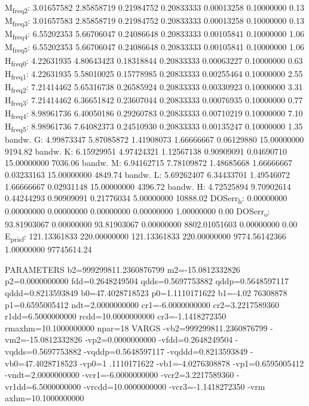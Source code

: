 \documentclass[11pt]{article}
\begin{document}
M\textsubscript{freq}\textsubscript{2}:   3.01657582   2.85858719   0.21984752   0.20833333   0.00013258   0.10000000         0.13
M\textsubscript{freq}\textsubscript{3}:   3.01657583   2.85858719   0.21984752   0.20833333   0.00013258   0.10000000         0.13
M\textsubscript{freq}\textsubscript{4}:   6.55202353   5.66706047   0.24086648   0.20833333   0.00105841   0.10000000         1.06
M\textsubscript{freq}\textsubscript{5}:   6.55202353   5.66706047   0.24086648   0.20833333   0.00105841   0.10000000         1.06
H\textsubscript{freq}\textsubscript{0}:   4.22631935   4.80643423   0.18318844   0.20833333   0.00063227   0.10000000         0.63
H\textsubscript{freq}\textsubscript{1}:   4.22631935   5.58010025   0.15778985   0.20833333   0.00255464   0.10000000         2.55
H\textsubscript{freq}\textsubscript{2}:   7.21414462   5.65316738   0.26585924   0.20833333   0.00330923   0.10000000         3.31
H\textsubscript{freq}\textsubscript{3}:   7.21414462   6.36651842   0.23607044   0.20833333   0.00076935   0.10000000         0.77
H\textsubscript{freq}\textsubscript{4}:   8.98961736   6.40050186   0.29260783   0.20833333   0.00710219   0.10000000         7.10
H\textsubscript{freq}\textsubscript{5}:   8.98961736   7.64082373   0.24510930   0.20833333   0.00135247   0.10000000         1.35
bandw. G:   4.99873347   5.87085872   1.41908073   1.66666667   0.06129880  15.00000000      9194.82
bandw. K:   6.15929951   4.97424321   1.12567138   0.90909091   0.04690710  15.00000000      7036.06
bandw. M:   6.94162715   7.78109872   1.48685668   1.66666667   0.03233163  15.00000000      4849.74
bandw. L:   5.69262407   6.34433701   1.49546072   1.66666667   0.02931148  15.00000000      4396.72
bandw. H:   4.72525894   9.70902614   0.44244293   0.90909091   0.21776034   5.00000000     10888.02
DOSerr\textsubscript{h}:   0.00000000   0.00000000   0.00000000   0.00000000   0.00000000   1.00000000         0.00
DOSerr\textsubscript{o}:  93.81903067   0.00000000  93.81903067   0.00000000 8802.01051603   0.00000000         0.00
E\textsubscript{pris}\textsubscript{f}: 121.13361833 220.00000000 121.13361833 220.00000000 9774.56142366   1.00000000  97745614.24

PARAMETERS
  b2=999299811.2360876799 m2=-15.0812332826 p2=0.0000000000 fdd=0.2648249504 qdds=0.5697753882 qddp=0.5648597117 qddd=0.8213593849 b0=47.4028718523 p0=1.1110171622 b1=-4.02
76308878 p1=0.6595005412 ndt=2.0000000000 cr1=-6.0000000000 cr2=3.2217589360 r1dd=6.5000000000 rcdd=10.0000000000 cr3=-1.1418272350 rmaxhm=10.1000000000 npar=18 
VARGS
    -vb2=999299811.2360876799 -vm2=-15.0812332826 -vp2=0.0000000000 -vfdd=0.2648249504 -vqdds=0.5697753882 -vqddp=0.5648597117 -vqddd=0.8213593849 -vb0=47.4028718523 -vp0=1
.1110171622 -vb1=-4.0276308878 -vp1=0.6595005412 -vndt=2.0000000000 -vcr1=-6.0000000000 -vcr2=3.2217589360 -vr1dd=6.5000000000 -vrcdd=10.0000000000 -vcr3=-1.1418272350 -vrm
axhm=10.1000000000 
\end{document}
